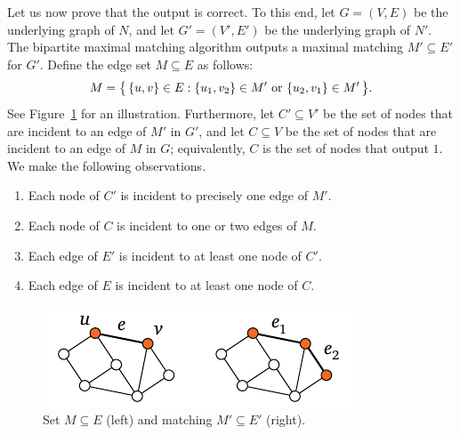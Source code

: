 Let us now prove that the output is correct. To this end, let $G = (V,E)$ be the underlying graph of $N$, and let $G' = (V'\!,E')$ be the underlying graph of $N'$. The bipartite maximal matching algorithm outputs a maximal matching $M' \subseteq E'$ for $G'$. Define the edge set $M \subseteq E$ as follows:
\begin{equation}\label{eq:vc3-M}
    M = \bigl\{\,  \{u,v\} \in E : \{u_1,v_2\} \in M' \text{ or } \{u_2,v_1\} \in M'  \,\bigr\}.
\end{equation}
See Figure~\ref{fig:vc3b} for an illustration. Furthermore, let $C' \subseteq V'$ be the set of nodes that are incident to an edge of $M'$ in $G'$, and let $C \subseteq V$ be the set of nodes that are incident to an edge of $M$ in $G$; equivalently, $C$ is the set of nodes that output $1$. We make the following observations.
\begin{enumerate}[noitemsep]
    \item Each node of $C'$ is incident to precisely one edge of $M'$.
    \item\label{item:vc3deg} Each node of $C$ is incident to one or two edges of $M$.
    \item Each edge of $E'$ is incident to at least one node of $C'$.
    \item\label{item:vc3isvc} Each edge of $E$ is incident to at least one node of $C$.
\end{enumerate}
\begin{figure}
    \centering
    \includegraphics[page=\PVCThreeApxB]{figs.pdf}
    \caption{Set $M \subseteq E$ (left) and matching $M' \subseteq E'$ (right).}\label{fig:vc3b}
\end{figure}

